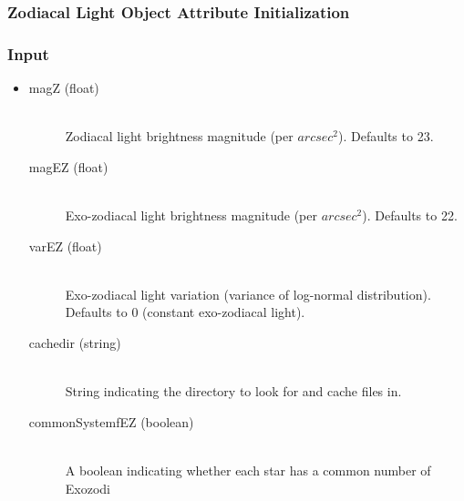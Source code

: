 \documentclass[cleanfoot]{asme2ej}
\begin{document}
\subsubsection{Zodiacal Light Object Attribute Initialization}

\subsubsection*{Input}
\begin{itemize}
\item
\begin{description}
    \item[magZ (float)] \hfill \\ Zodiacal light brightness magnitude (per $ arcsec^2 $). Defaults to 23.
    \item[magEZ (float)] \hfill \\ Exo-zodiacal light brightness magnitude (per $ arcsec^2 $). Defaults to 22.
    \item[varEZ (float)] \hfill \\ Exo-zodiacal light variation (variance of log-normal distribution). Defaults to 0 (constant exo-zodiacal light).
    \item[cachedir (string)] \hfill \\ String indicating the directory to look for and cache files in.
    \item[commonSystemfEZ (boolean)] \hfill \\ A boolean indicating whether each star has a common number of Exozodi 
\end{description}
\end{itemize}
\end{document}
